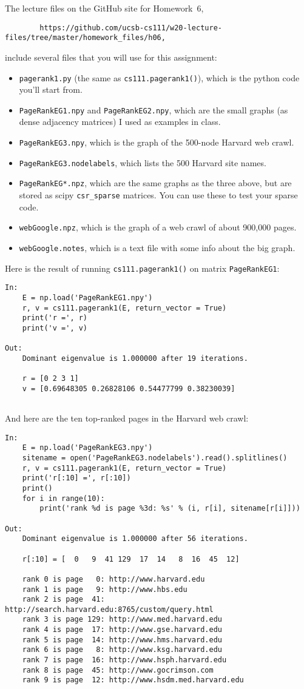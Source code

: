 \documentclass[11pt]{article}
\begin{document}
The lecture files on the GitHub site for Homework~6,
\begin{verbatim}
        https://github.com/ucsb-cs111/w20-lecture-files/tree/master/homework_files/h06,
\end{verbatim}
include several files that you will use for this assignment:
\begin{itemize}
\item{\tt pagerank1.py} (the same as {\tt cs111.pagerank1()}), which is the python code you'll start from.
\item{\tt PageRankEG1.npy} and {\tt PageRankEG2.npy}, which are the small
   graphs (as dense adjacency matrices) I used as examples in class.
\item{\tt PageRankEG3.npy}, which is the graph of the 500-node Harvard web crawl.
\item{\tt PageRankEG3.nodelabels}, which lists the 500 Harvard site names.
\item{\tt PageRankEG*.npz}, which are the same graphs as the three above, but
   are stored as scipy {\tt csr\_sparse} matrices. You can use these to test
   your sparse code.
\item{\tt webGoogle.npz}, which is the graph of a web crawl of about 900,000 pages.
\item{\tt webGoogle.notes}, which is a text file with some info about the big graph.
\end{itemize}
Here is the result of running {\tt cs111.pagerank1()} on matrix {\tt PageRankEG1}:
\begin{verbatim}
In:
    E = np.load('PageRankEG1.npy')
    r, v = cs111.pagerank1(E, return_vector = True)
    print('r =', r)
    print('v =', v)

Out:
    Dominant eigenvalue is 1.000000 after 19 iterations.
    
    r = [0 2 3 1]
    v = [0.69648305 0.26828106 0.54477799 0.38230039]


\end{verbatim}
And here are the ten top-ranked pages in the Harvard web crawl:
\begin{verbatim}
In:
    E = np.load('PageRankEG3.npy')
    sitename = open('PageRankEG3.nodelabels').read().splitlines()
    r, v = cs111.pagerank1(E, return_vector = True)
    print('r[:10] =', r[:10])
    print()
    for i in range(10):
        print('rank %d is page %3d: %s' % (i, r[i], sitename[r[i]]))

Out:
    Dominant eigenvalue is 1.000000 after 56 iterations.
    
    r[:10] = [  0   9  41 129  17  14   8  16  45  12]
    
    rank 0 is page   0: http://www.harvard.edu
    rank 1 is page   9: http://www.hbs.edu
    rank 2 is page  41: http://search.harvard.edu:8765/custom/query.html
    rank 3 is page 129: http://www.med.harvard.edu
    rank 4 is page  17: http://www.gse.harvard.edu
    rank 5 is page  14: http://www.hms.harvard.edu
    rank 6 is page   8: http://www.ksg.harvard.edu
    rank 7 is page  16: http://www.hsph.harvard.edu
    rank 8 is page  45: http://www.gocrimson.com
    rank 9 is page  12: http://www.hsdm.med.harvard.edu
\end{verbatim}
\end{document}

